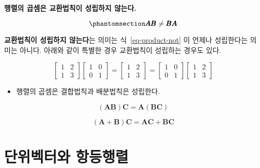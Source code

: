 \documentclass[
  11pt,
  a4paper,
  oneside]{scrbook}
\providecommand{\tightlist}{%
  \setlength{\itemsep}{0pt}\setlength{\parskip}{0pt}}\usepackage{longtable,booktabs,array}
\theoremstyle{definition}
\theoremstyle{plain}
\theoremstyle{definition}
\theoremstyle{definition}
\theoremstyle{remark}
\begin{document}
\textbf{행렬의 곱셈은 교환법칙이 성립하지 않는다.}

\begin{equation}\phantomsection\label{eq-product-not}{  \pmb A \pmb B \ne  \pmb B \pmb A}\end{equation}

\begin{tcolorbox}[enhanced jigsaw, colback=white, title=\textcolor{quarto-callout-caution-color}{\faFire}\hspace{0.5em}{주의}, colbacktitle=quarto-callout-caution-color!10!white, toprule=.15mm, breakable, bottomtitle=1mm, left=2mm, colframe=quarto-callout-caution-color-frame, leftrule=.75mm, coltitle=black, toptitle=1mm, titlerule=0mm, arc=.35mm, opacityback=0, opacitybacktitle=0.6, rightrule=.15mm, bottomrule=.15mm]

\textbf{교환법칙이 성립하지 않는다}는 의미는 식~\ref{eq-product-not} 이
언제나 성립한다는 의미는 아니다. 아래와 같이 특별한 경우 교환법칙이
성립하는 경우도 있다.

\[
\begin{bmatrix}
1 & 2 \\
1 & 3 
\end{bmatrix}
\begin{bmatrix}
1 & 0 \\
0 & 1 
\end{bmatrix}
=
\begin{bmatrix}
1 & 2 \\
1 & 3 
\end{bmatrix}
=
\begin{bmatrix}
1 & 0 \\
0 & 1 
\end{bmatrix}
\begin{bmatrix}
1 & 2 \\
1 & 3 
\end{bmatrix}
\]

\end{tcolorbox}

\begin{itemize}
\tightlist
\item
  행렬의 곱셈은 결합법칙과 배분법칙은 성립한다.
\end{itemize}

\[ (\pmb A \pmb B) \pmb C = \pmb A (\pmb B \pmb C) \]

\[ (\pmb A + \pmb B) \pmb C = \pmb A \pmb C +  \pmb B \pmb C \]

\section{단위벡터와
항등행렬}\label{uxb2e8uxc704uxbca1uxd130uxc640-uxd56duxb4f1uxd589uxb82c}
\end{document}
